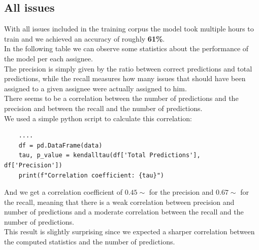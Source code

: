 \documentclass[tikz,10pt,fleqn]{article}
\begin{document}
\subsection*{All issues}
With all issues included in the training corpus the model took multiple hours to train and we achieved an accuracy of roughly \textbf{61\%}.\\
In the following table we can observe some statistics about the performance of the model per each assignee.\\
The precision is simply given by the ratio between correct predictions and total predictions, while the recall measures how many issues that should have been assigned to a given assignee were actually assigned to him.\\
There seems to be a correlation between the number of predictions and the precision and between the recall and the number of predictions.\\
We used a simple python script to calculate this correlation:
\begin{verbatim}
	....
    df = pd.DataFrame(data)
    tau, p_value = kendalltau(df['Total Predictions'], df['Precision'])
    print(f"Correlation coefficient: {tau}")
\end{verbatim}

And we get a correlation coefficient of $0.45\sim$ for the precision and $0.67\sim$ for the recall, meaning that there is a weak correlation between precision and number of predictions and a moderate correlation between the recall and the number of predictions.\\
This result is slightly surprising since we expected a sharper correlation between the computed statistics and the number of predictions.
\end{document}
